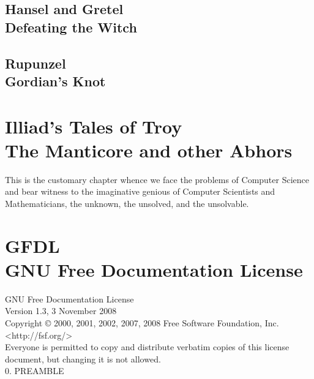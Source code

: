 \documentclass[oneside,12pt]{memoir} %
\begin{document}
\chapter{Hansel and Gretel \\
\large Defeating the Witch}




\chapter{Rupunzel \\
\large Gordian's Knot}





\part{%
Illiad's Tales of Troy\\
 The Manticore and other Abhors}
 
This is the customary chapter whence we face the problems of Computer Science and bear witness to the imaginative genious of Computer Scientists and Mathematicians, the unknown, the unsolved, and the unsolvable. 
\part{%
GFDL\\
GNU Free Documentation License}




GNU Free Documentation License\\

Version 1.3, 3 November 2008\\

Copyright © 2000, 2001, 2002, 2007, 2008 Free Software Foundation, Inc. <http://fsf.org/>\\

Everyone is permitted to copy and distribute verbatim copies of this license document, but changing it is not allowed.\\

0. PREAMBLE\\
\end{document}
